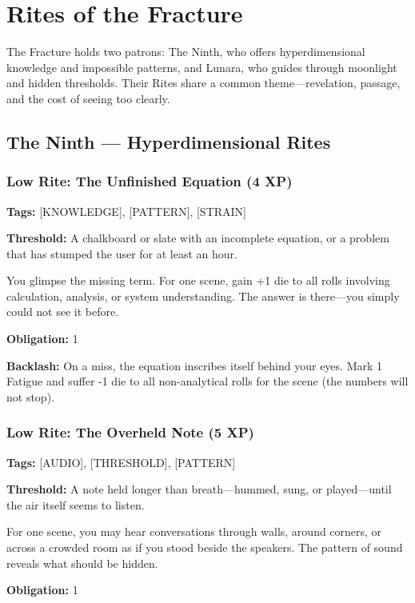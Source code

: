 \section{Rites of the Fracture}

The Fracture holds two patrons: The Ninth, who offers hyperdimensional knowledge and impossible patterns, and Lunara, who guides through moonlight and hidden thresholds. Their Rites share a common theme—revelation, passage, and the cost of seeing too clearly.

\subsection{The Ninth — Hyperdimensional Rites}

\subsubsection{Low Rite: The Unfinished Equation (4 XP)}

\textbf{Tags:} [KNOWLEDGE], [PATTERN], [STRAIN]

\textbf{Threshold:} A chalkboard or slate with an incomplete equation, or a problem that has stumped the user for at least an hour.

You glimpse the missing term. For one scene, gain +1 die to all rolls involving calculation, analysis, or system understanding. The answer is there—you simply could not see it before.

\textbf{Obligation:} 1

\textbf{Backlash:} On a miss, the equation inscribes itself behind your eyes. Mark 1 Fatigue and suffer -1 die to all non-analytical rolls for the scene (the numbers will not stop).

\subsubsection{Low Rite: The Overheld Note (5 XP)}

\textbf{Tags:} [AUDIO], [THRESHOLD], [PATTERN]

\textbf{Threshold:} A note held longer than breath—hummed, sung, or played—until the air itself seems to listen.

For one scene, you may hear conversations through walls, around corners, or across a crowded room as if you stood beside the speakers. The pattern of sound reveals what should be hidden.

\textbf{Obligation:} 1

